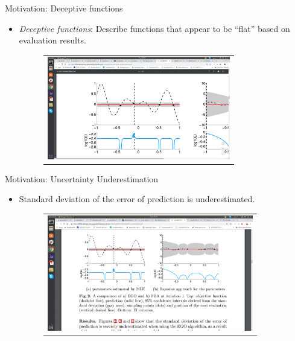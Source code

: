 \documentclass{beamer}
\begin{document}
\begin{frame}{Motivation: Deceptive functions}

\begin{itemize}
	\item \textit{Deceptive functions}: Describe functions that appear to be “flat” based on evaluation results.
		
	\begin{figure}
		\centering
		\begin{tabular}{c}
			\includegraphics[width=8cm, trim={11.5cm 1cm 16cm 7cm},clip]{Decep_Func.png}
		\end{tabular}
	\end{figure}

\end{itemize}
\end{frame}




\begin{frame}{Motivation: Uncertainty Underestimation}

\begin{itemize}
	\item  Standard deviation of the error of prediction is underestimated. 
	
	\begin{figure}
		\centering
		\begin{tabular}{c}
			\includegraphics[width=9cm, trim={11.5cm 13cm 7.5cm 6cm},clip]{decep_func_conf.png}
		\end{tabular}
	\end{figure}
	
\end{itemize}

\end{frame}
\end{document}
